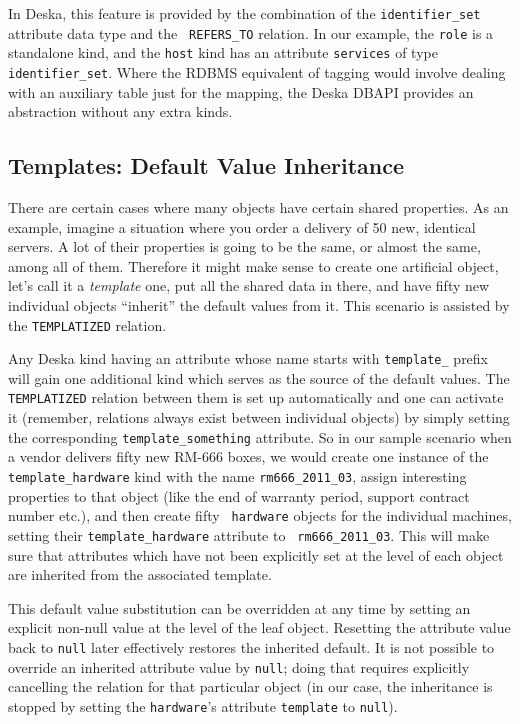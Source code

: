 \documentclass[deska]{subfiles}
\begin{document}
In Deska, this feature is provided by the combination of the {\tt identifier\_set} attribute data type and the {\tt
REFERS\_TO} relation.  In our example, the {\tt role} is a standalone kind, and the {\tt host} kind has an attribute
{\tt services} of type {\tt identifier\_set}.  Where the RDBMS equivalent of tagging would involve dealing with an
auxiliary table just for the mapping, the Deska DBAPI provides an abstraction without any extra kinds.

\subsection{Templates: Default Value Inheritance}
\label{sec:relation-templatized}

There are certain cases where many objects have certain shared properties.  As an example, imagine a situation where you
order a delivery of 50 new, identical servers.  A lot of their properties is going to be the same, or almost the same,
among all of them.  Therefore it might make sense to create one artificial object, let's call it a {\em template} one,
put all the shared data in there, and have fifty new individual objects ``inherit'' the default values from it.  This
scenario is assisted by the {\tt TEMPLATIZED} relation.

Any Deska kind having an attribute whose name starts with {\tt template\_} prefix will gain one additional kind which
serves as the source of the default values.  The {\tt TEMPLATIZED} relation between them is set up automatically and one
can activate it (remember, relations always exist between individual objects) by simply setting the corresponding
{\tt template\_something} attribute.  So in our sample scenario when a vendor delivers fifty new RM-666 boxes, we would
create one instance of the {\tt template\_hardware} kind with the name {\tt rm666\_2011\_03}, assign interesting
properties to that object (like the end of warranty period, support contract number etc.), and then create fifty {\tt
hardware} objects for the individual machines, setting their {\tt template\_hardware} attribute to {\tt
rm666\_2011\_03}.  This will make sure that attributes which have not been explicitly set at the level of each object
are inherited from the associated template.

This default value substitution can be overridden at any time by setting an explicit non-null value at the level of the
leaf object.  Resetting the attribute value back to {\tt null} later effectively restores the inherited default.  It is
not possible to override an inherited attribute value by {\tt null}; doing that requires explicitly cancelling the
relation for that particular object (in our case, the inheritance is stopped by setting the {\tt hardware}'s attribute
{\tt template} to {\tt null}).
\end{document}
